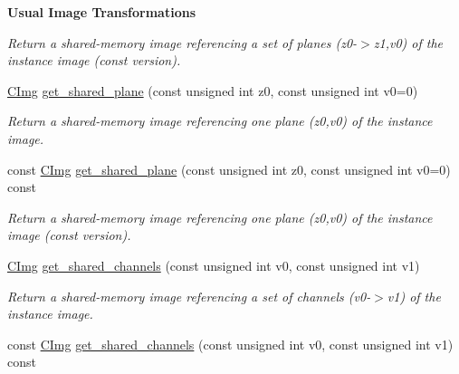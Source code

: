 \begin{Indent}{\bf Usual Image Transformations}
\begin{DoxyCompactItemize}
\begin{DoxyCompactList}\small\item\em Return a shared-\/memory image referencing a set of planes (z0-\/$>$z1,v0) of the instance image (const version). \item\end{DoxyCompactList}\item 
\hypertarget{structcimg__library_1_1_c_img_afca9bb286cfa7964bf5ae3b48791e86f}{
\hyperlink{structcimg__library_1_1_c_img}{CImg} \hyperlink{structcimg__library_1_1_c_img_afca9bb286cfa7964bf5ae3b48791e86f}{get\_\-shared\_\-plane} (const unsigned int z0, const unsigned int v0=0)}
\label{structcimg__library_1_1_c_img_afca9bb286cfa7964bf5ae3b48791e86f}

\begin{DoxyCompactList}\small\item\em Return a shared-\/memory image referencing one plane (z0,v0) of the instance image. \item\end{DoxyCompactList}\item 
\hypertarget{structcimg__library_1_1_c_img_a8f379d2747764150b87f1542ee1fdbaf}{
const \hyperlink{structcimg__library_1_1_c_img}{CImg} \hyperlink{structcimg__library_1_1_c_img_a8f379d2747764150b87f1542ee1fdbaf}{get\_\-shared\_\-plane} (const unsigned int z0, const unsigned int v0=0) const }
\label{structcimg__library_1_1_c_img_a8f379d2747764150b87f1542ee1fdbaf}

\begin{DoxyCompactList}\small\item\em Return a shared-\/memory image referencing one plane (z0,v0) of the instance image (const version). \item\end{DoxyCompactList}\item 
\hypertarget{structcimg__library_1_1_c_img_a910439b3bf66d2f01a6c7516d504faa6}{
\hyperlink{structcimg__library_1_1_c_img}{CImg} \hyperlink{structcimg__library_1_1_c_img_a910439b3bf66d2f01a6c7516d504faa6}{get\_\-shared\_\-channels} (const unsigned int v0, const unsigned int v1)}
\label{structcimg__library_1_1_c_img_a910439b3bf66d2f01a6c7516d504faa6}

\begin{DoxyCompactList}\small\item\em Return a shared-\/memory image referencing a set of channels (v0-\/$>$v1) of the instance image. \item\end{DoxyCompactList}\item 
\hypertarget{structcimg__library_1_1_c_img_a736815226ced7ea3cbf721dcc3c55e2d}{
const \hyperlink{structcimg__library_1_1_c_img}{CImg} \hyperlink{structcimg__library_1_1_c_img_a736815226ced7ea3cbf721dcc3c55e2d}{get\_\-shared\_\-channels} (const unsigned int v0, const unsigned int v1) const }
\label{structcimg__library_1_1_c_img_a736815226ced7ea3cbf721dcc3c55e2d}


\end{DoxyCompactItemize}
\end{Indent}
